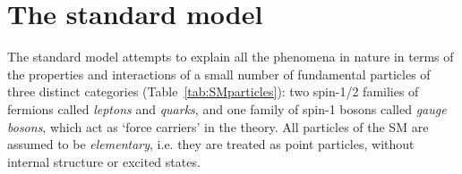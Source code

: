 \section{The standard model}\label{sec:SMintro}

The standard model attempts to explain all the phenomena in nature in terms of the properties and interactions of a small number of fundamental particles
of three distinct categories (Table~\ref{tab:SMparticles}): two spin-1/2 families of fermions called \textit{leptons} and \textit{quarks}, and one family of spin-1 bosons called \textit{gauge bosons},
which act as `force carriers' in the theory.
All particles of the SM are assumed to be \textit{elementary}, i.e. they are treated as point particles, without internal structure or excited states.\\

